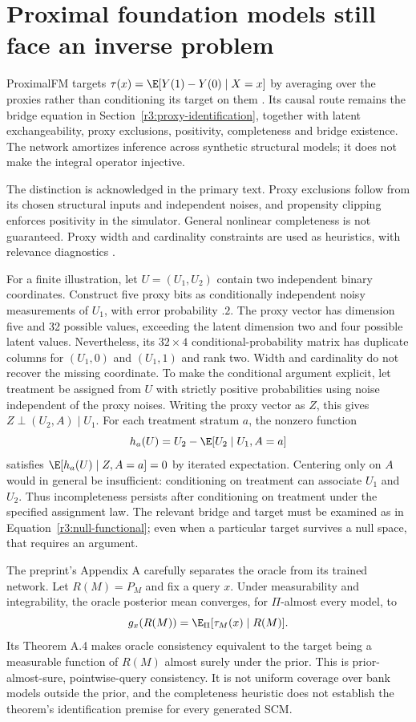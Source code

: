 \section{Proximal foundation models still face an inverse problem}
\label{r3:proximal-fm}

ProximalFM targets $\tau(x)=\E[Y(1)-Y(0)\mid X=x]$ by averaging over
the proxies rather than conditioning its target on them
\citep[Sections 2--3]{proximalfm2026}. Its causal route remains the bridge
equation in Section~\ref{r3:proxy-identification}, together with latent
exchangeability, proxy exclusions, positivity, completeness and bridge
existence. The network amortizes inference across synthetic structural
models; it does not make the integral operator injective.

The distinction is acknowledged in the primary text. Proxy exclusions
follow from its chosen structural inputs and independent noises, and
propensity clipping enforces positivity in the simulator. General nonlinear
completeness is not guaranteed. Proxy width and cardinality constraints
are used as heuristics, with relevance diagnostics
\citep[Section 3.1 and Appendix B.3.4]{proximalfm2026}.

For a finite illustration, let $U=(U_1,U_2)$ contain two independent
binary coordinates. Construct five proxy bits as conditionally independent
noisy measurements of $U_1$, with error probability $.2$. The proxy
vector has dimension five and 32 possible values, exceeding the latent
dimension two and four possible latent values. Nevertheless, its
$32\times4$ conditional-probability matrix has duplicate columns for
$(U_1,0)$ and $(U_1,1)$ and rank two. Width and cardinality do not
recover the missing coordinate. To make the conditional argument explicit,
let treatment be assigned from $U$ with strictly positive probabilities
using noise independent of the proxy noises. Writing the proxy vector as
$Z$, this gives $Z\perp (U_2,A)\mid U_1$. For each treatment stratum $a$,
the nonzero function
\[
 h_a(U)=U_2-\E[U_2\mid U_1,A=a]
\]
satisfies $\E[h_a(U)\mid Z,A=a]=0$ by iterated expectation. Centering only
on $A$ would in general be insufficient: conditioning on treatment can
associate $U_1$ and $U_2$. Thus incompleteness persists after conditioning
on treatment under the specified assignment law.
The relevant bridge and target must be examined as in
Equation~\eqref{r3:null-functional}; even when a particular target
survives a null space, that requires an argument.

The preprint's Appendix A carefully separates the oracle from its trained
network. Let $R(M)=P_M$ and fix a query $x$. Under measurability and
integrability, the oracle posterior mean converges, for $\Pi$-almost every
model, to
\[
 g_x(R(M))=\E_\Pi[\tau_M(x)\mid R(M)].
\]
Its Theorem A.4 makes oracle consistency equivalent to the target being
a measurable function of $R(M)$ almost surely under the prior. This is
prior-almost-sure, pointwise-query consistency. It is not uniform coverage
over bank models outside the prior, and the completeness heuristic does
not establish the theorem's identification premise for every generated SCM.

